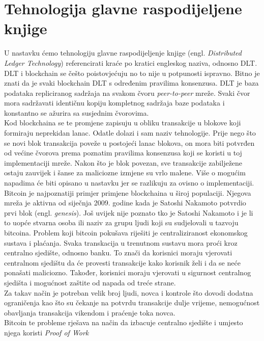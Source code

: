 \documentclass[times, utf8, zavrsni]{fer}
\begin{document}
\chapter{Tehnologija glavne raspodijeljene knjige}
U nastavku ćemo tehnologiju glavne raspodijeljenje knjige (engl. \emph{Distributed Ledger Technology})
 referencirati kraće po kratici engleskog naziva, odnosno DLT. \\ 
DLT i blockchain se češto poistovjećuju no to nije u potpunosti ispravno. Bitno je znati da je 
svaki blockchain DLT s određenim pravilima konsenzusa.
DLT je baza podataka repliciranog sadržaja na svakom čvoru \emph{peer-to-peer} mreže. Svaki čvor
mora sadržavati identičnu kopiju kompletnog sadržaja baze podataka i konstantno se ažurira sa susjednim
čvorovima. \\
Kod blockchaina se te promjene zapisuju u obliku transakcije u blokove koji formiraju neprekidan lanac.
Odatle dolazi i sam naziv tehnologije. Prije nego što se novi blok transakcija poveže u postojeći lanac
blokova, on mora biti potvrđen od većine čvorova prema poznatim pravilima konsenzusa koji se koristi
u toj implementaciji mreže. Nakon što je blok povezan, sve transakcije zabilježene ostaju zauvijek i
šanse za maliciozne izmjene su vrlo malene. Više o mogućim napadima će biti opisano u nastavku jer
se razlikuju za ovisno o implementaciji. \\
Bitcoin je najpoznatiji primjer primjene blockchaina u široj populaciji. Njegova mreža je aktivna 
od siječnja 2009. godine kada je Satoshi Nakamoto potvrdio prvi blok (engl. \emph{genesis}).
Još uvijek nije poznato tko je Satoshi Nakamoto i je li to uopće stvarna osoba ili naziv za grupu
ljudi koji su sudjelovali u tazvoju bitcoina. Problem koji bitcoin pokušava riješiti je centraliziranost
ekonomskog sustava i plaćanja. Svaka transkacija u trenutnom sustavu mora proći kroz centralno sjedište,
odnosno banku. To znači da korisnici moraju vjerovati centralnom sjedištu da će provesti transakcije
kako korisnik želi i da se neće ponašati maliciozno. Također, korisnici moraju vjerovati u sigurnost
centralnog sjedišta i mogućnost zaštite od napada od treće strane. \\
Za takav način je potreban velik broj ljudi, novca i kontrole što dovodi dodatna ograničenja kao što 
su čekanje na potvrdu transakcije dulje vrijeme, nemogućnost obavljanja transakcija vikendom i praćenje
toka novca. \\
Bitcoin te probleme rješava na način da izbacuje centralno sjedište i umjesto njega koristi \emph{Proof of Work}
\end{document}
